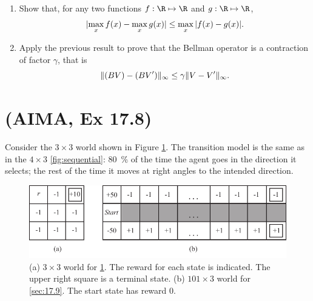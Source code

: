 \documentclass[11pt, a4paper]{article}
\begin{document}
\begin{enumerate}
    \item Show that, for any two functions $f: \R \mapsto \R$ and $g: \R \mapsto \R$,
    \begin{equation*}
        \lvert\max_x f(x) - \max_x g(x)\rvert \leq \max_x \, \lvert f(x) - g(x)\rvert .
    \end{equation*}
    
    \item Apply the previous result to prove that the Bellman operator is a contraction of factor $\gamma$, that is
    \begin{equation*}
        \lVert(BV) - (BV')\rVert_\infty \leq \gamma \lVert V - V'\rVert_\infty .
    \end{equation*}
\end{enumerate}

\newpage

\section{(AIMA, Ex 17.8)} \label{sec:17.8}

Consider the $3 \times 3$ world shown in Figure \ref{fig:grid-mdp}. The transition model is the same as in the $4 \times 3$ \ref{fig:sequential}: \SI{80}{\percent} of the time the agent goes in the direction it selects; the rest of the time it moves at right angles to the intended direction.

\begin{figure}[h]
    \centering
    \includegraphics{figures/e6_grid_mdp.pdf}
    \caption{(a) $3\times3$ world for \ref{sec:17.8}. The reward for each state is indicated. The upper right square is a terminal state. (b) $101 \times 3$ world for \ref{sec:17.9}. The start state has reward $0$.}
    \label{fig:grid-mdp}
\end{figure}
\end{document}
